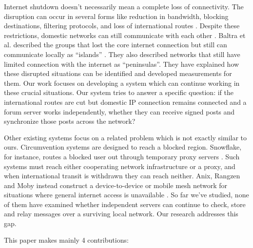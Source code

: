 \documentclass[conference,a4paper]{IEEEtran}
\begin{document}
Internet shutdown doesn’t necessarily mean a complete loss of connectivity. The disruption can occur in several forms like reduction in bandwidth, blocking destinations, filtering protocols, and loss of international routes \cite{ooni2025bangladesh}. Despite these restrictions, domestic networks can still communicate with each other \cite{bischof2023shutdowns,baltra2024connectivity}. Baltra et al. described the groups that lost the core internet connection but still can communicate locally as “islands” \cite{baltra2024connectivity}. They also described networks that still have limited connection with the internet as “peninsulas”. They have explained how these disrupted situations can be identified and developed measurements for them.  Our work focuses on developing a system which can continue working in these crucial situations. Our system tries to answer a specific question: if the international routes are cut but domestic IP connection remains connected and a forum server works independently, whether they can receive signed posts and synchronize those posts across the network?

Other existing systems focus on a related problem which is not exactly similar to ours. Circumvention systems are designed to reach a blocked region. Snowflake, for instance, routes a blocked user out through temporary proxy servers \cite{bocovich2024snowflake}. Such systems must reach either cooperating network infrastructure or a proxy, and when international transit is withdrawn they can reach neither. Anix, Rangzen and Moby instead construct a device-to-device or mobile mesh network for situations where general internet access is unavailable \cite{kamali2025anix,lerner2016rangzen,pradeep2022moby}. So far we’ve studied, none of them have examined whether independent servers can continue to check, store and relay messages over a surviving local network. Our research addresses this gap.

This paper makes mainly 4 contributions:
\end{document}
